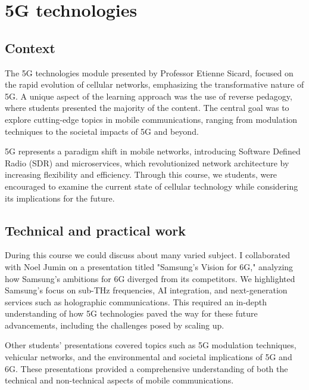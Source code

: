 \section{5G technologies}
\subsection{Context}

\indent \indent The 5G technologies module presented by Professor Etienne Sicard, focused on the rapid evolution of cellular networks, emphasizing the transformative nature of 5G. A unique aspect of the learning approach was the use of reverse pedagogy, where students presented the majority of the content. The central goal was to explore cutting-edge topics in mobile communications, ranging from modulation techniques to the societal impacts of 5G and beyond.

5G represents a paradigm shift in mobile networks, introducing Software Defined Radio (SDR) and microservices, which revolutionized network architecture by increasing flexibility and efficiency. Through this course, we students, were encouraged to examine the current state of cellular technology while considering its implications for the future.
\subsection{Technical and practical work}

\indent \indent During this course we could discuss about many varied subject. I collaborated with Noel Jumin on a presentation titled "Samsung's Vision for 6G," analyzing how Samsung's ambitions for 6G diverged from its competitors. We highlighted Samsung's focus on sub-THz frequencies, AI integration, and next-generation services such as holographic communications. This required an in-depth understanding of how 5G technologies paved the way for these future advancements, including the challenges posed by scaling up.

Other students' presentations covered topics such as 5G modulation techniques, vehicular networks, and the environmental and societal implications of 5G and 6G. These presentations provided a comprehensive understanding of both the technical and non-technical aspects of mobile communications.

